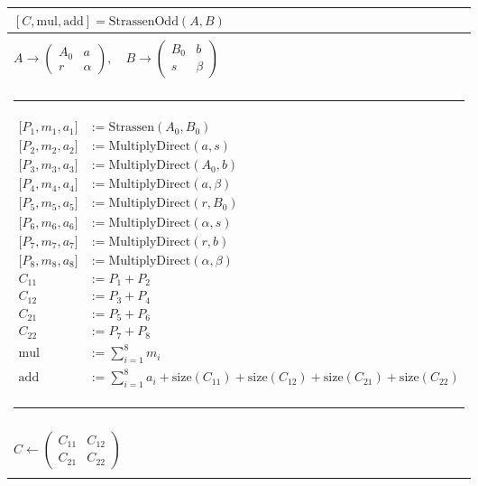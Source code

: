 \documentclass{article}
\begin{document}
\begin{center}
\renewcommand{\arraystretch}{1.5}
\begin{tabular}{|l|}
\hline
$[C, \text{mul}, \text{add}] = \text{StrassenOdd}(A, B)$ \\
\hline
\\
$A \rightarrow \left( \begin{array}{c|c}
    A_0 & a \\ \hline
    r & \alpha
\end{array} \right), \quad
B \rightarrow \left( \begin{array}{c|c}
    B_0 & b \\ \hline
    s & \beta
\end{array} \right)$ \\
\\
\textcolor{red}{\rule{14cm}{0.6pt}} \\
$\begin{aligned}
    {[}P_1, m_1, a_1{]} &:= \text{Strassen}(A_0, B_0) \\
    {[}P_2, m_2, a_2{]} &:= \text{MultiplyDirect}(a, s) \\
    {[}P_3, m_3, a_3{]} &:= \text{MultiplyDirect}(A_0, b) \\
    {[}P_4, m_4, a_4{]} &:= \text{MultiplyDirect}(a, \beta) \\
    {[}P_5, m_5, a_5{]} &:= \text{MultiplyDirect}(r, B_0) \\
    {[}P_6, m_6, a_6{]} &:= \text{MultiplyDirect}(\alpha, s) \\
    {[}P_7, m_7, a_7{]} &:= \text{MultiplyDirect}(r, b) \\
    {[}P_8, m_8, a_8{]} &:= \text{MultiplyDirect}(\alpha, \beta) \\
    C_{11} &:= P_1 + P_2 \\
    C_{12} &:= P_3 + P_4 \\
    C_{21} &:= P_5 + P_6 \\
    C_{22} &:= P_7 + P_8 \\
    \text{mul} &:= \sum_{i=1}^{8} m_i \\
    \text{add} &:= \sum_{i=1}^{8} a_i + \text{size}(C_{11}) + \text{size}(C_{12}) + \text{size}(C_{21}) + \text{size}(C_{22})
\end{aligned}$ \\
\textcolor{red}{\rule{14cm}{0.6pt}} \\
\\
$C \leftarrow \left( \begin{array}{c|c}
    C_{11} & C_{12} \\ \hline
    C_{21} & C_{22}
\end{array} \right)$ \\
\\
\hline
\end{tabular}
\end{center}
\end{document}
